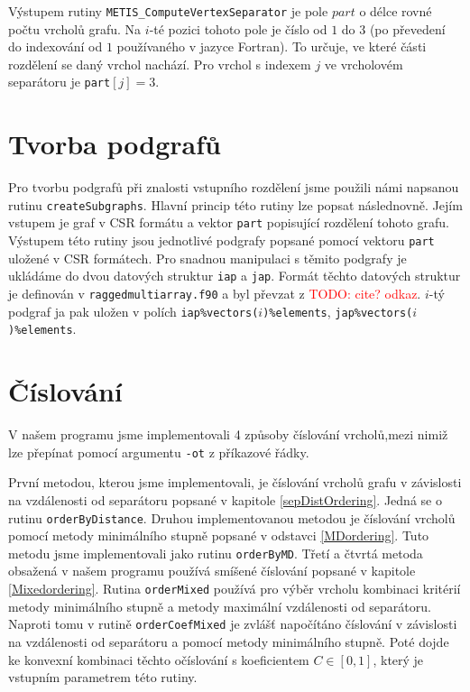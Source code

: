 \documentclass[11pt,american,czech,oneside]{book}
\theoremstyle{plain}
\theoremstyle{definition}
\newcommand{\TODO}[1]{\textcolor{red}{TODO: #1}}
\begin{document}
Výstupem rutiny \texttt{METIS\_ComputeVertexSeparator} je pole $part$ o délce rovné počtu vrcholů grafu. Na $i$-té pozici tohoto pole je číslo od $1$ do $3$ (po převedení do indexování od $1$ používaného v jazyce Fortran). To určuje, ve které části rozdělení se daný vrchol nachází. Pro vrchol s indexem $j$ ve vrcholovém separátoru je \texttt{part}$[j] = 3$.

\section{Tvorba podgrafů}
Pro tvorbu podgrafů při znalosti vstupního rozdělení jsme použili námi napsanou rutinu \texttt{createSubgraphs}. Hlavní princip této rutiny lze popsat následnovně. Jejím vstupem je graf v CSR formátu a vektor \texttt{part} popisující rozdělení tohoto grafu. Výstupem této rutiny jsou jednotlivé podgrafy popsané pomocí vektoru \texttt{part} uložené v CSR formátech. Pro snadnou manipulaci s těmito podgrafy je ukládáme do dvou datových struktur \texttt{iap} a \texttt{jap}. Formát těchto datových struktur je definován v \texttt{raggedmultiarray.f90} a byl převzat z \TODO{cite? odkaz}. $i$-tý podgraf ja pak uložen v polích \texttt{iap\%vectors($i$)\%elements}, \texttt{jap\%vectors($i$)\%elements}.


\section{Číslování}
V našem programu jsme implementovali 4 způsoby číslování vrcholů,mezi nimiž lze přepínat pomocí argumentu \texttt{-ot} z příkazové řádky.

První metodou, kterou jsme implementovali, je číslování vrcholů grafu v závislosti na vzdálenosti od separátoru popsané v kapitole \ref{sepDistOrdering}. Jedná se o rutinu \texttt{orderByDistance}. Druhou implementovanou metodou je číslování vrcholů pomocí metody minimálního stupně popsané v odstavci \ref{MDordering}. Tuto metodu jsme implementovali jako rutinu \texttt{orderByMD}. Třetí a čtvrtá metoda obsažená v našem programu používá smíšené číslování popsané v kapitole \ref{Mixedordering}. Rutina \texttt{orderMixed} používá pro výběr vrcholu kombinaci kritérií metody minimálního stupně a metody maximální vzdálenosti od separátoru. Naproti tomu v rutině \texttt{orderCoefMixed} je zvlášť napočítáno číslování v závislosti na vzdálenosti od separátoru a pomocí metody minimálního stupně. Poté dojde ke konvexní kombinaci těchto očíslování s koeficientem $C \in [0,1]$, který je vstupním parametrem této rutiny.
\end{document}
